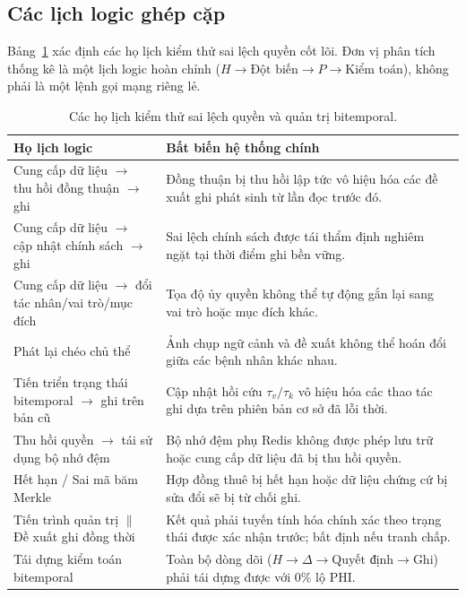 \documentclass[11pt]{article}
\begin{document}
\subsection{Các lịch logic ghép cặp}
Bảng~\ref{tab:schedules_vi} xác định các họ lịch kiểm thử sai lệch quyền cốt lõi. Đơn vị phân tích thống kê là một lịch logic hoàn chỉnh ($H \to \text{Đột biến} \to P \to \text{Kiểm toán}$), không phải là một lệnh gọi mạng riêng lẻ.

\begin{table}[H]
\caption{Các họ lịch kiểm thử sai lệch quyền và quản trị bitemporal.}
\label{tab:schedules_vi}
\centering\small
\setlength{\tabcolsep}{4pt}
\begin{tabularx}{\textwidth}{p{}X}
\toprule
\textbf{Họ lịch logic} & \textbf{Bất biến hệ thống chính} \\
\midrule
Cung cấp dữ liệu $\to$ thu hồi đồng thuận $\to$ ghi & Đồng thuận bị thu hồi lập tức vô hiệu hóa các đề xuất ghi phát sinh từ lần đọc trước đó. \\
Cung cấp dữ liệu $\to$ cập nhật chính sách $\to$ ghi & Sai lệch chính sách được tái thẩm định nghiêm ngặt tại thời điểm ghi bền vững. \\
Cung cấp dữ liệu $\to$ đổi tác nhân/vai trò/mục đích & Tọa độ ủy quyền không thể tự động gắn lại sang vai trò hoặc mục đích khác. \\
Phát lại chéo chủ thể & Ảnh chụp ngữ cảnh và đề xuất không thể hoán đổi giữa các bệnh nhân khác nhau. \\
Tiến triển trạng thái bitemporal $\to$ ghi trên bản cũ & Cập nhật hồi cứu $\tau_v/\tau_k$ vô hiệu hóa các thao tác ghi dựa trên phiên bản cơ sở đã lỗi thời. \\
Thu hồi quyền $\to$ tái sử dụng bộ nhớ đệm & Bộ nhớ đệm phụ Redis không được phép lưu trữ hoặc cung cấp dữ liệu đã bị thu hồi quyền. \\
Hết hạn / Sai mã băm Merkle & Hợp đồng thuê bị hết hạn hoặc dữ liệu chứng cứ bị sửa đổi sẽ bị từ chối ghi. \\
Tiến trình quản trị $\parallel$ Đề xuất ghi đồng thời & Kết quả phải tuyến tính hóa chính xác theo trạng thái được xác nhận trước; bất định nếu tranh chấp. \\
Tái dựng kiểm toán bitemporal & Toàn bộ dòng dõi ($H \to \Delta \to \text{Quyết định} \to \text{Ghi}$) phải tái dựng được với 0\% lộ PHI. \\
\bottomrule
\end{tabularx}
\end{table}
\end{document}
